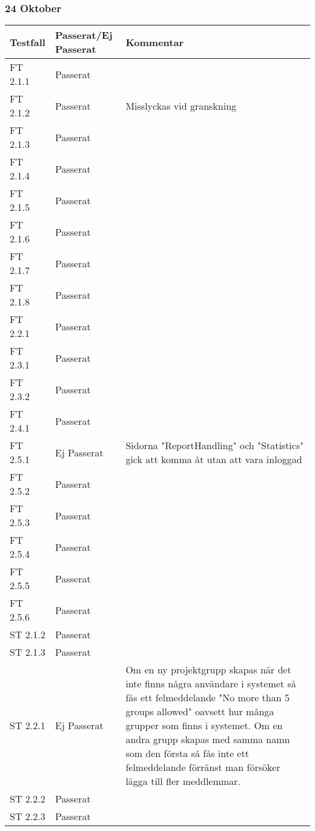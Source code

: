\documentclass[a4paper]{article}
\begin{document}
\subsubsection{24 Oktober}
\begin{tabular}{| l | l | p{9cm} |}
\hline
Testfall &  Passerat/Ej Passerat & Kommentar\\
\hline
FT 2.1.1 & Passerat & \\
\hline
FT 2.1.2 & Passerat & Misslyckas vid granskning\\
\hline
FT 2.1.3 & Passerat & \\
\hline
FT 2.1.4 & Passerat & \\
\hline
FT 2.1.5 & Passerat & \\
\hline
FT 2.1.6 & Passerat & \\
\hline
FT 2.1.7 & Passerat & \\
\hline
FT 2.1.8 & Passerat & \\
\hline
FT 2.2.1 & Passerat & \\
\hline
FT 2.3.1 & Passerat & \\
\hline
FT 2.3.2 & Passerat & \\
\hline
FT 2.4.1 & Passerat & \\
\hline
FT 2.5.1 & Ej Passerat & Sidorna "ReportHandling" och "Statistics" gick att komma åt utan att vara inloggad\\
\hline
FT 2.5.2 & Passerat & \\
\hline
FT 2.5.3 & Passerat & \\
\hline
FT 2.5.4 & Passerat & \\
\hline
FT 2.5.5 & Passerat & \\
\hline
FT 2.5.6 & Passerat & \\
\hline
ST 2.1.2 & Passerat & \\
\hline
ST 2.1.3 & Passerat & \\
\hline
ST 2.2.1 & Ej Passerat & Om en ny projektgrupp skapas när det inte finns några användare i systemet så fås ett felmeddelande "No more than 5 groups allowed" oavsett hur många grupper som finns i systemet. Om en andra grupp skapas med samma namn som den första så fås inte ett felmeddelande förränst man försöker lägga till fler meddlemmar.\\
\hline
ST 2.2.2 & Passerat & \\
\hline
ST 2.2.3 & Passerat & \\
\hline
\end{tabular}
\end{document}
